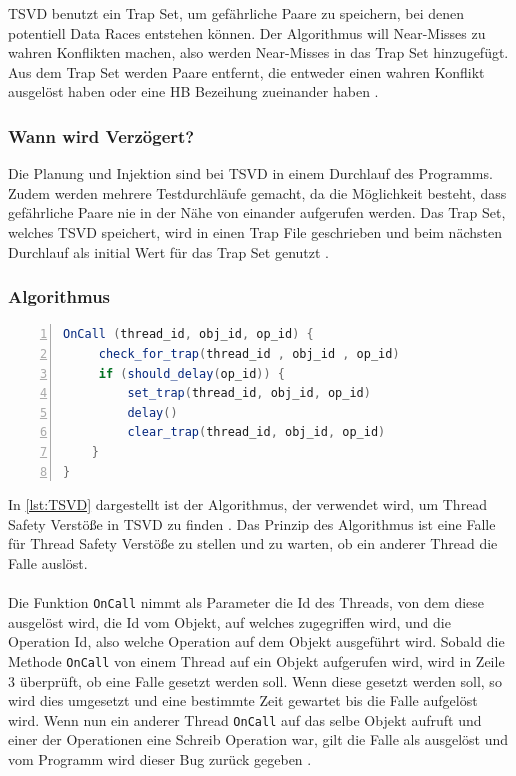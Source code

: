 \acs{TSVD} benutzt ein Trap Set, um gefährliche Paare zu speichern, bei denen potentiell Data Races entstehen können. Der Algorithmus will Near-Misses zu wahren Konflikten machen, also werden Near-Misses in das Trap Set hinzugefügt. Aus dem Trap Set werden Paare entfernt, die entweder einen wahren Konflikt ausgelöst haben oder eine \acs{HB} Bezeihung zueinander haben \cite[vgl.][167]{li_efficient_2019}.

\subsubsection*{Wann wird Verzögert?}

Die Planung und Injektion sind bei \acs{TSVD} in einem Durchlauf des Programms. Zudem werden mehrere Testdurchläufe gemacht, da die Möglichkeit besteht, dass gefährliche Paare nie in der Nähe von einander aufgerufen werden. Das Trap Set, welches \acs{TSVD} speichert, wird in einen Trap File geschrieben und beim nächsten Durchlauf als initial Wert für das Trap Set genutzt \cite[vgl.][169]{li_efficient_2019}.  


\subsubsection*{Algorithmus}

\begin{lstlisting}[language=Java,frame=tb,caption={\acs{TSVD} Trap Mechanism}, label={lst:TSVD}, numbers=left, stepnumber=1,  captionpos=b, tabsize=4]
OnCall (thread_id, obj_id, op_id) { 
     check_for_trap(thread_id , obj_id , op_id) 
     if (should_delay(op_id)) {
         set_trap(thread_id, obj_id, op_id)
         delay()
         clear_trap(thread_id, obj_id, op_id)
    }
}
\end{lstlisting}
\noindent
In \ref{lst:TSVD} dargestellt ist der Algorithmus, der verwendet wird, um Thread Safety Verstöße in \acs{TSVD} zu finden \cite[Figure 5,][166]{li_efficient_2019}. Das Prinzip des Algorithmus ist eine Falle für Thread Safety Verstöße zu stellen und zu warten, ob ein anderer Thread die Falle auslöst. \\
\\
Die Funktion \texttt{OnCall} nimmt als Parameter die Id des Threads, von dem diese ausgelöst wird, die Id vom Objekt, auf welches zugegriffen wird, und die Operation Id, also welche Operation auf dem Objekt ausgeführt wird. Sobald die Methode \texttt{OnCall} von einem Thread auf ein Objekt aufgerufen wird, wird in Zeile 3 überprüft, ob eine Falle gesetzt werden soll. Wenn diese gesetzt werden soll, so wird dies umgesetzt und eine bestimmte Zeit gewartet bis die Falle aufgelöst wird. Wenn nun ein anderer Thread \texttt{OnCall} auf das selbe Objekt aufruft und einer der Operationen eine Schreib Operation war, gilt die Falle als ausgelöst und vom Programm wird dieser Bug zurück gegeben \cite[vgl.][166]{li_efficient_2019}.

